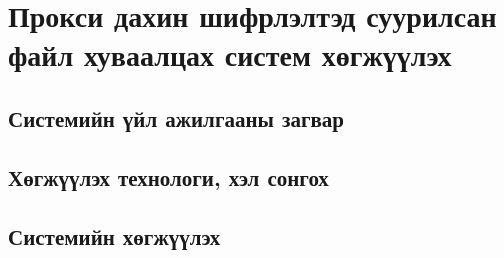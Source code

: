 
\chapter{Прокси дахин шифрлэлтэд суурилсан файл хуваалцах систем хөгжүүлэх} %
\label{Chapter3} %
\pagecolor{white}

\section{Системийн үйл ажилгааны загвар}

\section{Хөгжүүлэх технологи, хэл сонгох}

\section{Системийн хөгжүүлэх}